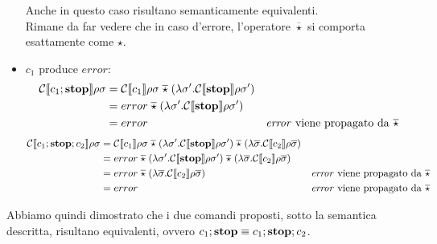 \begin{itemize}
            Anche in questo caso risultano semanticamente equivalenti.\\
            Rimane da far vedere che in caso d'errore, l'operatore $\overline{\star}$ si comporta esattamente come $\star$.
        \item $c_1$ produce $error$:
            \begin{align*}
                \mathcal{C}\llbracket c_1;\mbox{\textbf{stop}} \rrbracket\rho\sigma =\;& \mathcal{C}\llbracket c_1 \rrbracket\rho\sigma\; \overline{\star}\; (\lambda\sigma'.\mathcal{C}\llbracket \mbox{\textbf{stop}} \rrbracket\rho\sigma')\\
                =\;& error\; \overline{\star}\; (\lambda\sigma'.\mathcal{C}\llbracket \mbox{\textbf{stop}} \rrbracket\rho\sigma')\\
                =\;& error &\mbox{\textit{error} viene propagato da $\overline{\star}$}
            \end{align*}
            \begin{align*}
                \mathcal{C}\llbracket c_1;\mbox{\textbf{stop}};c_2 \rrbracket\rho\sigma =\;& \mathcal{C}\llbracket c_1 \rrbracket\rho\sigma\; \overline{\star}\; (\lambda\sigma'.\mathcal{C}\llbracket \mbox{\textbf{stop}} \rrbracket\rho\sigma')\; \overline{\star}\; (\lambda\overline{\sigma}.\mathcal{C}\llbracket c_2 \rrbracket\rho\overline{\sigma})\\
                =\;& error\; \overline{\star}\; (\lambda\sigma'.\mathcal{C}\llbracket \mbox{\textbf{stop}} \rrbracket\rho\sigma')\; \overline{\star}\; (\lambda\overline{\sigma}.\mathcal{C}\llbracket c_2 \rrbracket\rho\overline{\sigma})\\
                =\;& error\; \overline{\star}\; (\lambda\overline{\sigma}.\mathcal{C}\llbracket c_2 \rrbracket\rho\overline{\sigma}) &\mbox{\textit{error} viene propagato da $\overline{\star}$}\\
                =\;& error\; &\mbox{\textit{error} viene propagato da $\overline{\star}$}
            \end{align*}
    \end{itemize}
    
    Abbiamo quindi dimostrato che i due comandi proposti, sotto la semantica descritta, risultano equivalenti, ovvero $c_1;\mbox{\textbf{stop}} \equiv c_1;\mbox{\textbf{stop}};c_2$.
